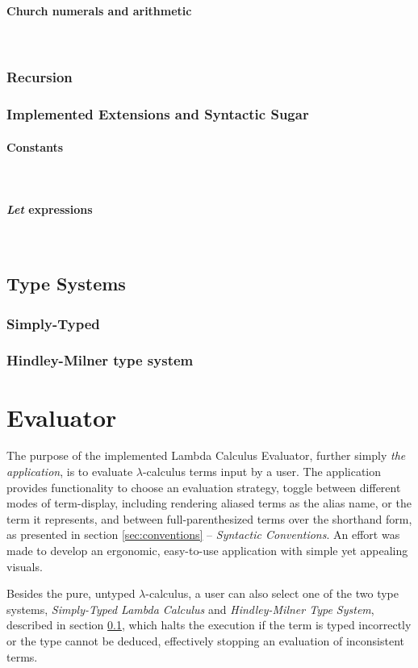 \documentclass[a4paper,10pt]{article}
\begin{document}
\paragraph{Church numerals and arithmetic}~\\ \label{encoding}
\subsubsection{Recursion}
\subsubsection{Implemented Extensions and Syntactic Sugar}
\paragraph{Constants}~\\
\paragraph{\textit{Let} expressions}~\\
\subsection{Type Systems} \label{sec:types}
\subsubsection{Simply-Typed }
\subsubsection{Hindley-Milner type system}

\section{Evaluator}
The purpose of the implemented Lambda Calculus Evaluator,
further simply \textit{the application}, is to evaluate $\lambda$-calculus
terms input by a user.
The application provides functionality to
choose an evaluation strategy, toggle between different modes
of term-display, including rendering aliased terms as the alias name,
or the term it represents, and between full-parenthesized terms over
the shorthand form, as presented in section \ref{sec:conventions} -- \textit{Syntactic Conventions}.
An effort was made to develop an ergonomic, easy-to-use application with 
simple yet appealing visuals.

Besides the pure, untyped $\lambda$-calculus, a user can also select one of the two
type systems, \textit{Simply-Typed Lambda Calculus} and \textit{Hindley-Milner Type System},
described in section \ref{sec:types}, which halts the execution if the term is typed incorrectly or the type cannot
be deduced, effectively stopping an evaluation of inconsistent terms.
\end{document}
